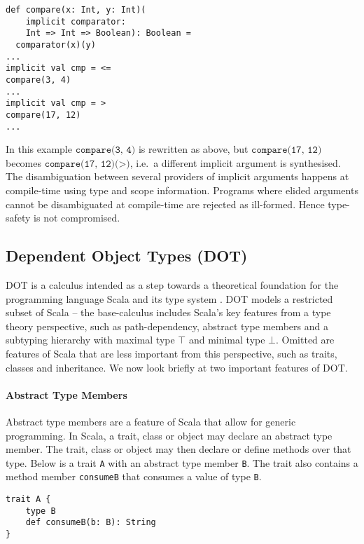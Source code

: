 \begin{minipage}{\linewidth}
\begin{lstlisting}[mathescape]
def compare(x: Int, y: Int)(
    implicit comparator:
    Int => Int => Boolean): Boolean =
  comparator(x)(y)
...
implicit val cmp = <=
compare(3, 4)
...
implicit val cmp = >
compare(17, 12)
...
\end{lstlisting}
\end{minipage}

In this example $\texttt{compare(3, 4)}$ is rewritten as above, but
$\texttt{compare(17, 12)}$ becomes $\texttt{compare(17, 12)(>)}$, i.e.~a
different implicit argument is synthesised. The disambiguation between several
providers of implicit arguments happens at compile-time using type and scope
information. Programs where elided arguments cannot be disambiguated at
compile-time are rejected as ill-formed. Hence type-safety is not compromised.

\subsection{Dependent Object Types (DOT)}

DOT is a calculus intended as a step towards a theoretical foundation for the
programming language Scala and its type system \cite{AMO12}. DOT models a
restricted subset of Scala -- the base-calculus includes Scala's key features
from a type theory perspective, such as path-dependency, abstract type members
and a subtyping hierarchy with maximal type $\top$ and minimal type $\bot$.
Omitted are features of Scala that are less important from this perspective,
such as traits, classes and inheritance. We now look briefly at two important
features of DOT.

\paragraph{Abstract Type Members}

Abstract type members are a feature of Scala that allow for generic programming.
In Scala, a trait, class or object may declare an abstract type member. The
trait, class or object may then declare or define methods over that type. Below
is a trait \texttt{A} with an abstract type member \texttt{B}. The trait also
contains a method member \texttt{consumeB} that consumes a value of type
\texttt{B}.

\begin{minipage}{\linewidth}
\begin{lstlisting}[mathescape]
trait A {
    type B
    def consumeB(b: B): String
}
\end{lstlisting}
\end{minipage}

